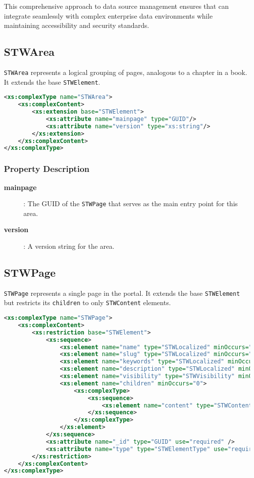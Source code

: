 This comprehensive approach to data source management ensures that \wbdl{} can integrate seamlessly with complex enterprise data environments while maintaining accessibility and security standards.

\subsection{STWArea}

	\texttt{STWArea} represents a logical grouping of pages, analogous to a chapter in a book. It extends the base \texttt{STWElement}.

\begin{lstlisting}[language=XML,caption={STWArea Type Definition}]
<xs:complexType name="STWArea">
	<xs:complexContent>
		<xs:extension base="STWElement">
			<xs:attribute name="mainpage" type="GUID"/>
			<xs:attribute name="version" type="xs:string"/>
		</xs:extension>
	</xs:complexContent>
</xs:complexType>
\end{lstlisting}

\subsubsection{Property Description}

\begin{description}
\item[\textbf{mainpage}]: The GUID of the \texttt{STWPage} that serves as the main entry point for this area.
\item[\textbf{version}]: A version string for the area.
\end{description}

\subsection{STWPage}

	\texttt{STWPage} represents a single page in the portal. It extends the base \texttt{STWElement} but restricts its \texttt{children} to only \texttt{STWContent} elements.

\begin{lstlisting}[language=XML,caption={STWPage Type Definition}]
<xs:complexType name="STWPage">
	<xs:complexContent>
		<xs:restriction base="STWElement">
			<xs:sequence>
				<xs:element name="name" type="STWLocalized" minOccurs="1" />
				<xs:element name="slug" type="STWLocalized" minOccurs="1" />
				<xs:element name="keywords" type="STWLocalized" minOccurs="0" />
				<xs:element name="description" type="STWLocalized" minOccurs="0" />
				<xs:element name="visibility" type="STWVisibility" minOccurs="0" />
				<xs:element name="children" minOccurs="0">
					<xs:complexType>
						<xs:sequence>
							<xs:element name="content" type="STWContent" minOccurs="0" maxOccurs="unbounded"/>
						</xs:sequence>
					</xs:complexType>
				</xs:element>
			</xs:sequence>
			<xs:attribute name="_id" type="GUID" use="required" />
			<xs:attribute name="type" type="STWElementType" use="required" />
		</xs:restriction>
	</xs:complexContent>
</xs:complexType>
\end{lstlisting}

